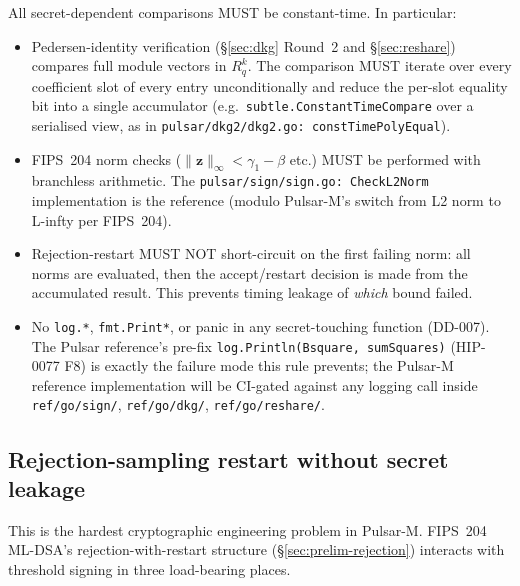 \documentclass[11pt,a4paper]{article}
\theoremstyle{definition}
\theoremstyle{remark}
\newcommand{\Rq}{R_q}
\begin{document}
All secret-dependent comparisons MUST be constant-time. In
particular:

\begin{itemize}[leftmargin=*, itemsep=0pt]
\item Pedersen-identity verification (\S\ref{sec:dkg} Round~2 and
\S\ref{sec:reshare}) compares full module vectors in $\Rq^k$. The
comparison MUST iterate over every coefficient slot of every entry
unconditionally and reduce the per-slot equality bit into a single
accumulator (e.g.\ \texttt{subtle.ConstantTimeCompare} over a
serialised view, as in
\texttt{pulsar/dkg2/dkg2.go: constTimePolyEqual}).
\item FIPS~204 norm checks ($\|\mathbf{z}\|_\infty < \gamma_1 - \beta$
etc.) MUST be performed with branchless arithmetic. The
\texttt{pulsar/sign/sign.go: CheckL2Norm} implementation is the
reference (modulo Pulsar-M's switch from L2 norm to L-infty per
FIPS~204).
\item Rejection-restart MUST NOT short-circuit on the first failing
norm: all norms are evaluated, then the accept/restart decision is
made from the accumulated result. This prevents timing leakage of
\emph{which} bound failed.
\item No \texttt{log.*}, \texttt{fmt.Print*}, or panic in any
secret-touching function (DD-007). The Pulsar reference's
pre-fix \texttt{log.Println(Bsquare, sumSquares)} (HIP-0077 F8) is
exactly the failure mode this rule prevents; the Pulsar-M reference
implementation will be CI-gated against any logging call inside
\texttt{ref/go/sign/}, \texttt{ref/go/dkg/}, \texttt{ref/go/reshare/}.
\end{itemize}

\subsection{Rejection-sampling restart without secret leakage}
\label{sec:impl-rejection-restart}

This is the hardest cryptographic engineering problem in Pulsar-M.
FIPS~204 ML-DSA's rejection-with-restart structure (\S\ref{sec:prelim-rejection})
interacts with threshold signing in three load-bearing places.
\end{document}
